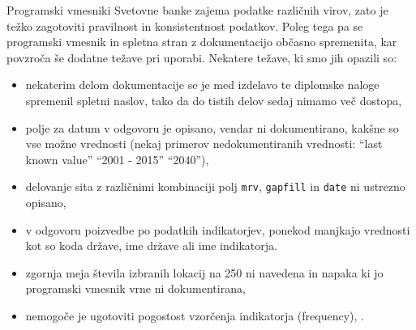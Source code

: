 Programski vmesniki Svetovne banke zajema podatke različnih virov, zato je
težko zagotoviti pravilnost in konsistentnost podatkov. Poleg tega pa se 
programski vmesnik in spletna stran z dokumentacijo občasno spremenita, kar
povzroča še dodatne težave pri uporabi. Nekatere težave, ki smo jih opazili
so:
\begin{itemize}  
\item nekaterim delom dokumentacije se je med izdelavo te diplomske naloge
  spremenil spletni naslov, tako da do tistih delov sedaj nimamo več dostopa,
\item polje za datum v odgovoru je opisano, vendar ni dokumentirano, kakšne so
    vse možne vrednosti (nekaj primerov nedokumentiranih vrednosti:
    ``last known value'' ``2001 - 2015'' ``2040''),
\item delovanje sita z različnimi kombinaciji polj \verb|mrv|, \verb|gapfill|
  in \verb|date| ni ustrezno opisano,
\item v odgovoru poizvedbe po podatkih indikatorjev, ponekod manjkajo vrednosti
  kot so koda države, ime države ali ime indikatorja.
\item zgornja meja števila izbranih lokacij na 250 ni navedena in napaka 
  ki jo programski vmesnik vrne ni dokumentirana,
\item nemogoče je ugotoviti pogostost vzorčenja indikatorja (frequency), .
\end{itemize}  







